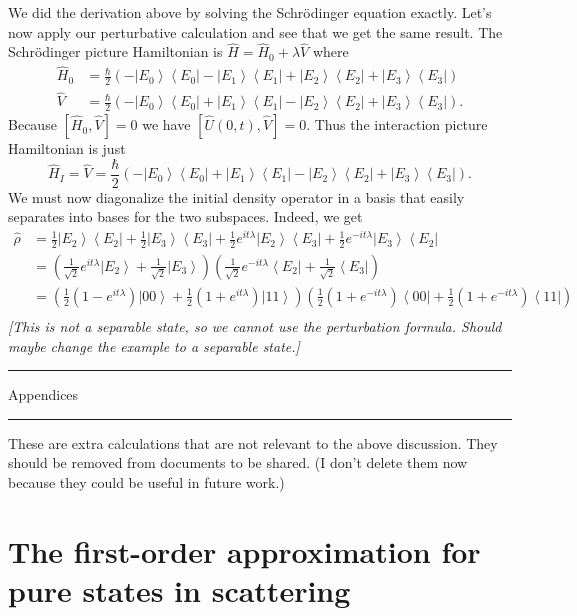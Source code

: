 \documentclass[11pt]{article}
\newcommand{\bra}[1]{\left\langle#1\right|}
\newcommand{\ket}[1]{\left|#1\right\rangle}
\newcommand{\op}[1]{\hat{#1}}
\theoremstyle{theorem}
\theoremstyle{remark}
\theoremstyle{step}
\theoremstyle{gap}
\begin{document}
We did the derivation above by solving the Schr\"odinger equation exactly. Let's now apply our perturbative calculation and see that we get the same result. The Schr\"odinger picture Hamiltonian is \(\op{H} = \op{H}_0 + \lambda \op{V}\) where
\begin{align*}
\op{H}_0 &= \frac{\hbar}{2} \left(-\ket{E_0}\bra{E_0} - \ket{E_1}\bra{E_1} + \ket{E_2}\bra{E_2} + \ket{E_3}\bra{E_3}\right) \\
\op{V} &= \frac{\hbar}{2} \left(-\ket{E_0}\bra{E_0} + \ket{E_1}\bra{E_1} - \ket{E_2}\bra{E_2} + \ket{E_3}\bra{E_3}\right).
\end{align*}
Because \([\op{H}_0, \op{V}] = 0\) we have \([\op{U}(0, t), \op{V}] = 0\). Thus the interaction picture Hamiltonian is just
\[\op{H}_I = \op{V} = \frac{\hbar}{2} \left(-\ket{E_0}\bra{E_0} + \ket{E_1}\bra{E_1} - \ket{E_2}\bra{E_2} + \ket{E_3}\bra{E_3}\right).\]
We must now diagonalize the initial density operator in a basis that easily separates into bases for the two subspaces. Indeed, we get
\begin{align*}
\op{\rho} &= \frac{1}{2}\ket{E_2}\bra{E_2} + \frac{1}{2}\ket{E_3}\bra{E_3} + \frac{1}{2} e^{it\lambda} \ket{E_2}\bra{E_3} + \frac{1}{2} e^{-it\lambda} \ket{E_3}\bra{E_2} \\
&= \left(\frac{1}{\sqrt{2}} e^{it\lambda}{\ket{E_2}} + \frac{1}{\sqrt{2}}\ket{E_3}\right) \left(\frac{1}{\sqrt{2}} e^{-it\lambda}{\bra{E_2}} + \frac{1}{\sqrt{2}}\bra{E_3}\right) \\
&= \left(\frac{1}{2} \left(1-e^{it\lambda}\right){\ket{00}} + \frac{1}{2}\left(1+e^{it\lambda}\right)\ket{11}\right) \left(\frac{1}{2} \left(1+e^{-it\lambda}\right){\bra{00}} + \frac{1}{2}\left(1+e^{-it\lambda}\right)\bra{11}\right) \\
\end{align*}
\emph{[This is not a separable state, so we cannot use the perturbation formula. Should maybe change the example to a separable state.]}



\appendix
\newpage
\hrule
\vspace{3em}
{\Huge Appendices}
\vspace{3em}
\hrule
\vspace{2em}

These are extra calculations that are not relevant to the above discussion. They should be removed from documents to be shared. (I don't delete them now because they could be useful in future work.)


\section{The first-order approximation for pure states in scattering}
\end{document}
